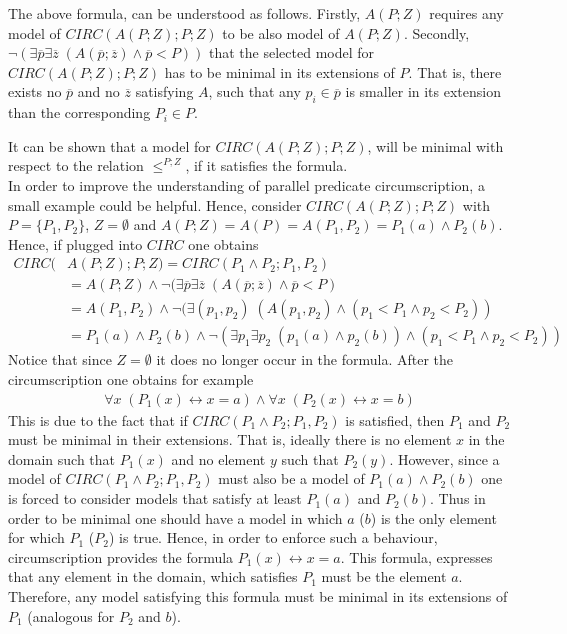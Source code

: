 \documentclass{article}
\begin{document}
The above formula, can be understood as follows. Firstly, $A(P;Z)$ requires any model of $CIRC(A(P;Z);P;Z)$ to be also model of $A(P;Z)$. Secondly,  $\neg (\exists \overline{p} \exists  \overline{z} \; (A( \overline{p}; \overline{z}) \wedge  \overline{p} < P))$ that the selected model for $CIRC(A(P;Z);P;Z)$ has to be minimal in its extensions of $P$. That is, there exists no $\overline{p}$ and no $\overline{z}$ satisfying $A$, such that any $p_i \in \overline{p}$ is smaller in its extension than the corresponding $P_i \in P$.
 
It can be shown that a model for $CIRC(A(P;Z);P;Z)$, will be minimal with respect to the relation $\leq^{P;Z}$, if it satisfies the formula. \cite{lifschitz1996circumscription}\\

In order to improve the understanding of parallel predicate circumscription, a small example could be helpful. Hence, consider  $CIRC(A(P;Z);P;Z)$ with $P=\{P_1,P_2\}$, $Z=\emptyset$ and $A(P;Z)=A(P)=A(P_1,P_2)=P_1(a) \wedge P_2(b)$. Hence, if plugged into $CIRC$ one obtains
\begin{equation*}
\begin{split}
CIRC(&A(P;Z);P;Z)=CIRC(P_1 \wedge P_2;P_1,P_2) \\
&=A(P;Z) \wedge \neg (\exists \overline{p} \exists  \overline{z} \; (A( \overline{p}; \overline{z}) \wedge  \overline{p} < P)\\
&=A(P_1,P_2) \wedge \neg (\exists (p_1, p_2)  \; (A( p_1, p_2) \wedge  (p_1 < P_1 \wedge p_2 < P_2))\\
&=P_1(a) \wedge P_2(b) \wedge \neg (\exists p_1\exists p_2 \; (p_1(a)\wedge p_2(b))  \wedge  (p_1 < P_1 \wedge p_2 < P_2))
\end{split}
\end{equation*}
Notice that since $Z=\emptyset$ it does no longer occur in the formula. 
After the circumscription one obtains for example 
\begin{equation*}
\begin{split}
\forall x\;( P_1(x) \leftrightarrow x=a) \wedge \forall x\;( P_2(x) \leftrightarrow x=b)
\end{split}
\end{equation*}
This is due to the fact that if $CIRC(P_1 \wedge P_2;P_1,P_2)$ is satisfied, then $P_1$ and $P_2$ must be minimal in their extensions. That is, ideally there is no element $x$ in the domain such that $P_1(x)$ and no element $y$ such that $P_2(y)$. However, since a model of $CIRC(P_1 \wedge P_2;P_1,P_2)$ must also be a model of $P_1(a) \wedge P_2(b)$
one is forced to consider models that satisfy at least $P_1(a)$ and $P_2(b)$.
Thus in order to be minimal one should have a model in which $a$ ($b$) is the only element for which $P_1$ ($P_2$) is true. Hence,  in order to enforce such a behaviour, circumscription provides the  formula $P_1(x) \leftrightarrow x=a$. This formula, expresses that any element in the domain, which satisfies $P_1$ must be the element $a$. Therefore, any model satisfying this formula must be minimal in its extensions of $P_1$ (analogous for $P_2$ and $b$). \\
\end{document}
